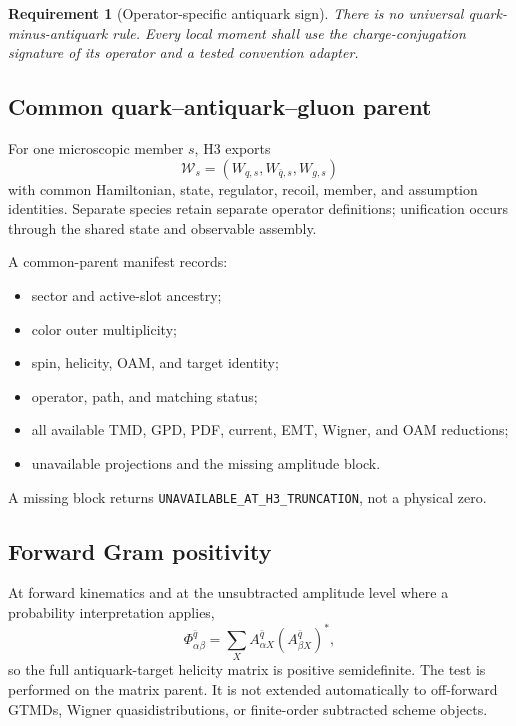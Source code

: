 \documentclass[11pt]{article}
\newtheorem{requirement}[definition]{Requirement}
\newcommand{\cW}{\mathcal W}
\begin{document}
\begin{requirement}[Operator-specific antiquark sign]
There is no universal quark-minus-antiquark rule.  Every local moment shall use
the charge-conjugation signature of its operator and a tested convention
adapter.
\end{requirement}

\subsection{Common quark--antiquark--gluon parent}

For one microscopic member \(s\), H3 exports
\begin{equation}
 \cW_s
 =
 \left(
 W_{q,s},W_{\bar q,s},W_{g,s}
 \right)
 \label{eq:common-parent-vector}
\end{equation}
with common Hamiltonian, state, regulator, recoil, member, and assumption
identities.  Separate species retain separate operator definitions; unification
occurs through the shared state and observable assembly.

A common-parent manifest records:
\begin{itemize}
 \item sector and active-slot ancestry;
 \item color outer multiplicity;
 \item spin, helicity, OAM, and target identity;
 \item operator, path, and matching status;
 \item all available TMD, GPD, PDF, current, EMT, Wigner, and OAM reductions;
 \item unavailable projections and the missing amplitude block.
\end{itemize}
A missing block returns \texttt{UNAVAILABLE\_AT\_H3\_TRUNCATION}, not a
physical zero.

\subsection{Forward Gram positivity}

At forward kinematics and at the unsubtracted amplitude level where a
probability interpretation applies,
\begin{equation}
 \Phi_{\alpha\beta}^{\bar q}
 =\sum_X A_{\alpha X}^{\bar q}
 \left(A_{\beta X}^{\bar q}\right)^*,
\end{equation}
so the full antiquark-target helicity matrix is positive semidefinite.  The
test is performed on the matrix parent.  It is not extended automatically to
off-forward GTMDs, Wigner quasidistributions, or finite-order subtracted
scheme objects.
\end{document}
